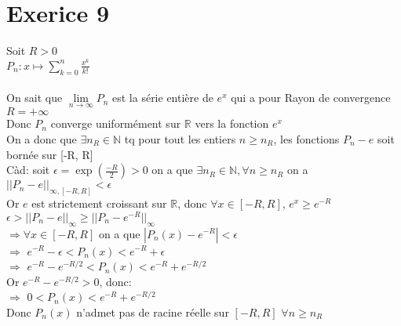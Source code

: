 \documentclass{article}
\author{Frederic Becerril}
\begin{document}
\part*{Exerice 9}

Soit $R > 0$\\
$P_n : x \mapsto \sum_{k = 0}^{n} \frac{x^k}{k!}$\\
\\
On sait que $\underset{n \rightarrow \infty}{\lim} P_n$ est la série entière de $e^x$ qui a pour Rayon de convergence $R = +\infty$\\
Donc $P_n$ converge uniformément sur $\mathbb{R}$ vers la fonction $e^x$\\
On a donc que $\exists n_R \in \mathbb{N}$ tq pour tout les entiers $n \geq n_R$, les fonctions $P_n - e$ soit bornée sur [-R, R]\\
Càd: soit $\epsilon = \exp\left(\frac{-R}{2}\right) > 0$ on a que $\exists n_R \in \mathbb{N}, \forall n \geq n_R$ on a $||P_n - e||_{\infty, [-R, R]} < \epsilon$\\
Or $e$ est strictement croissant sur $\mathbb{R}$, donc $\forall x \in [-R, R]$, $e^x \geq e^{-R}$\\
$\epsilon > ||P_n - e||_{\infty} \geq ||P_n - e^{-R}||_{\infty}$\\
$\Rightarrow \forall x \in [-R, R]$ on a que $|P_n(x) - e^{-R}| < \epsilon$\\
$\Rightarrow$ $e^{-R} - \epsilon < P_n(x) < e^{-R} + \epsilon$\\
$\Rightarrow$ $e^{-R} - e^{-R/2} < P_n(x) < e^{-R} + e^{-R/2}$\\
Or $e^{-R} - e^{-R/2} > 0$, donc:\\
$\Rightarrow$ $0 < P_n(x) < e^{-R} + e^{-R/2}$\\
Donc $P_n(x)$ n'admet pas de racine réelle sur $[-R, R]$ $\forall n \geq n_R$ 
\end{document}
